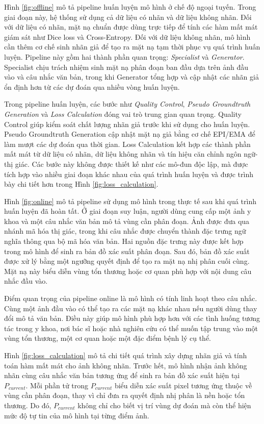 Hình \ref{fig:offline} mô tả pipeline huấn luyện mô hình ở chế độ ngoại tuyến. Trong giai đoạn này, hệ thống sử dụng cả dữ liệu có nhãn và dữ liệu không nhãn. Đối với dữ liệu có nhãn, mặt nạ chuẩn được dùng trực tiếp để tính các hàm mất mát giám sát như Dice loss và Cross-Entropy. Đối với dữ liệu không nhãn, mô hình cần thêm cơ chế sinh nhãn giả để tạo ra mặt nạ tạm thời phục vụ quá trình huấn luyện. Pipeline này gồm hai thành phần quan trọng: \textit{Specialist} và \textit{Generator}. Specialist chịu trách nhiệm sinh mặt nạ phân đoạn ban đầu dựa trên ảnh đầu vào và câu nhắc văn bản, trong khi Generator tổng hợp và cập nhật các nhãn giả ổn định hơn từ các dự đoán qua nhiều vòng huấn luyện.

Trong pipeline huấn luyện, các bước như \textit{Quality Control}, \textit{Pseudo Groundtruth Generation} và \textit{Loss Calculation} đóng vai trò trung gian quan trọng. Quality Control giúp kiểm soát chất lượng nhãn giả trước khi sử dụng cho huấn luyện. Pseudo Groundtruth Generation cập nhật mặt nạ giả bằng cơ chế EPI/EMA để làm mượt các dự đoán qua thời gian. Loss Calculation kết hợp các thành phần mất mát từ dữ liệu có nhãn, dữ liệu không nhãn và tín hiệu căn chỉnh ngôn ngữ-thị giác. Các bước này không được thiết kế như các mô-đun độc lập, mà được tích hợp vào nhiều giai đoạn khác nhau của quá trình huấn luyện và được trình bày chi tiết hơn trong Hình \ref{fig:loss_calculation}.

Hình \ref{fig:online} mô tả pipeline sử dụng mô hình trong thực tế sau khi quá trình huấn luyện đã hoàn tất. Ở giai đoạn suy luận, người dùng cung cấp một ảnh y khoa và một câu nhắc văn bản mô tả vùng cần phân đoạn. Ảnh được đưa qua nhánh mã hóa thị giác, trong khi câu nhắc được chuyển thành đặc trưng ngữ nghĩa thông qua bộ mã hóa văn bản. Hai nguồn đặc trưng này được kết hợp trong mô hình để sinh ra bản đồ xác suất phân đoạn. Sau đó, bản đồ xác suất được xử lý bằng một ngưỡng quyết định để tạo ra mặt nạ nhị phân cuối cùng. Mặt nạ này biểu diễn vùng tổn thương hoặc cơ quan phù hợp với nội dung câu nhắc đầu vào.

Điểm quan trọng của pipeline online là mô hình có tính linh hoạt theo câu nhắc. Cùng một ảnh đầu vào có thể tạo ra các mặt nạ khác nhau nếu người dùng thay đổi mô tả văn bản. Điều này giúp mô hình phù hợp hơn với các tình huống tương tác trong y khoa, nơi bác sĩ hoặc nhà nghiên cứu có thể muốn tập trung vào một vùng tổn thương, một cơ quan hoặc một đặc điểm bệnh lý cụ thể.

Hình \ref{fig:loss_calculation} mô tả chi tiết quá trình xây dựng nhãn giả và tính toán hàm mất mát cho ảnh không nhãn. Trước hết, mô hình nhận ảnh không nhãn cùng câu nhắc văn bản tương ứng để sinh ra bản đồ xác suất hiện tại $P_{current}$. Mỗi phần tử trong $P_{current}$ biểu diễn xác suất pixel tương ứng thuộc về vùng cần phân đoạn, thay vì chỉ đưa ra quyết định nhị phân là nền hoặc tổn thương. Do đó, $P_{current}$ không chỉ cho biết vị trí vùng dự đoán mà còn thể hiện mức độ tự tin của mô hình tại từng điểm ảnh.

